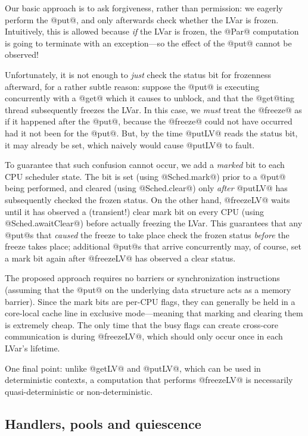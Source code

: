 Our basic approach is to ask forgiveness, rather than permission: we
eagerly perform the @put@, and only afterwards check whether the LVar
is frozen.  Intuitively, this is allowed because \emph{if} the LVar is
frozen, the @Par@ computation is going to terminate with an
exception---so the effect of the @put@ cannot be observed!

Unfortunately, it is not enough to \emph{just} check the status bit
for frozenness afterward, for a rather subtle reason: suppose the
@put@ is executing concurrently with a @get@ which it causes to
unblock, and that the @get@ting thread subsequently freezes the LVar.
In this case, we \emph{must} treat the @freeze@ as if it happened
after the @put@, because the @freeze@ could not have occurred had it
not been for the @put@. But, by the time @putLV@ reads the status bit,
it may already be set, which naively would cause @putLV@ to fault.

To guarantee that such confusion cannot occur, we add a \emph{marked}
bit to each CPU scheduler state.  The bit is set (using @Sched.mark@)
prior to a @put@ being performed, and cleared (using @Sched.clear@)
only \emph{after} @putLV@ has subsequently checked the frozen status.
On the other hand, @freezeLV@ waits until it has observed a
(transient!) clear mark bit on every CPU (using @Sched.awaitClear@)
before actually freezing the LVar.  This guarantees that any @put@s
that \emph{caused} the freeze to take place check the frozen status
\emph{before} the freeze takes place; additional @put@s that arrive
concurrently may, of course, set a mark bit again after @freezeLV@ has
observed a clear status.

The proposed approach requires no barriers or synchronization
instructions (assuming that the @put@ on the underlying data structure
acts as a memory barrier).  Since the mark bits are per-CPU flags,
they can generally be held in a core-local cache line in exclusive
mode---meaning that marking and clearing them is extremely cheap.  The
only time that the busy flags can create cross-core communication is
during @freezeLV@, which should only occur once in each LVar's lifetime.

One final point: unlike @getLV@ and @putLV@, which can be used in deterministic
contexts, a computation that performs @freezeLV@ is necessarily
quasi-deterministic or non-deterministic.

\subsection{Handlers, pools and quiescence}

